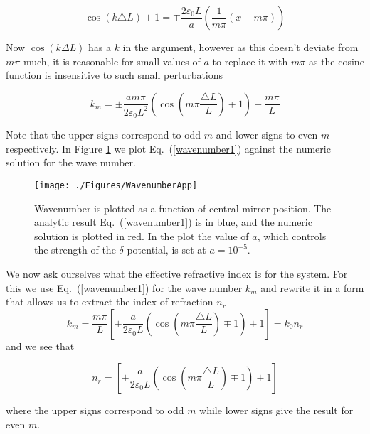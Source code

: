 \begin{equation}
\cos(k\triangle L)\pm1=\mp\frac{2\varepsilon_{0}L}{a}\left(\frac{1}{m\pi}\left(x-m\pi\right)\right)
\label{transcendental2}
\end{equation}

Now $\cos(k\Delta L)$ has a $k$ in the argument, however as this doesn't deviate from $m\pi$ much, it is reasonable for small values of $a$
to replace it with $m\pi$ as the cosine function is insensitive to such small perturbations 

\begin{equation}
k_{m}=\pm\frac{a m\pi}{2\varepsilon_{0}L^{2}}\left(\cos(m\pi\frac{\triangle L}{L})\mp1\right)+\frac{m\pi}{L}
\label{wavenumber1}
\end{equation}

Note that the upper signs correspond to odd $m$ and lower signs to
even $m$ respectively.  In Figure \ref{fig:wavenumberapprox} we plot Eq.\ (\ref{wavenumber1}) against the numeric solution for the wave number. 



\begin{figure}
\texttt{[image: ./Figures/WavenumberApp]}
\caption{Wavenumber is plotted as a function of central mirror position.  The analytic result Eq.\ (\ref{wavenumber1}) is in blue, and the numeric solution is plotted in red.  In the plot the value of $a$, which controls the strength of the $\delta$-potential, is set at $a=10^{-5}$. }
\label{fig:wavenumberapprox}
\end{figure}

We now ask ourselves what the effective refractive index is for the system. For this we use Eq.\ (\ref{wavenumber1}) for the wave number $k_{m}$ and rewrite it in a form that allows us to extract the index of refraction $n_{r}$
\begin{equation}
k_{m}=\frac{m\pi}{L}\left[\pm\frac{a}{2\varepsilon_{0}L}\left(\cos(m\pi\frac{\triangle L}{L})\mp1\right)+1\right]=k_{0} n_{r}
\label{wavenumber2}
\end{equation}
and we see that

\begin{equation}
n_{r}=\left[\pm\frac{a}{2\varepsilon_{0}L}\left(\cos(m\pi\frac{\triangle L}{L})\mp1\right)+1\right]
\label{refractiveindex}
\end{equation}

where the upper signs correspond to odd $m$ while lower signs give the result for even $m$.  

